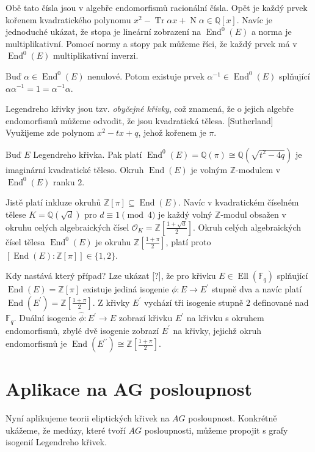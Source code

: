 \documentclass[12pt]{report}
\DeclareMathOperator{\Tr}{Tr}
\DeclareMathOperator{\N}{N}
\DeclareMathOperator{\End}{End}
\DeclareMathOperator{\Ell}{Ell}
\begin{document}
Obě tato čísla jsou v algebře endomorfismů racionální čísla. Opět je každý prvek kořenem kvadratického polynomu $x^2 - \Tr \alpha x + \N \alpha \in \mathbb{Q}[x]$. Navíc je jednoduché ukázat, že stopa je lineární zobrazení na $\End^0 (E)$ a norma je multiplikativní. Pomocí normy a stopy pak můžeme říci, že každý prvek má v $\End^0 (E)$ multiplikativní inverzi. 
\begin{veta}
Buď $\alpha \in \End^0 (E)$ nenulové. Potom existuje prvek $\alpha^{-1} \in \End^0 (E)$ splňující $\alpha \alpha^{-1} = 1 = \alpha^{-1} \alpha$. 
\end{veta}
Legendreho křivky jsou tzv. \textit{obyčejné křivky}, což znamená, že o jejich algebře endomorfismů můžeme odvodit, že jsou kvadratická tělesa. [Sutherland] Využijeme zde polynom $x^2-tx+q$, jehož kořenem je $\pi$.
\begin{dusledek}
Buď $E$ Legendreho křivka. Pak platí $\End^0(E) = \mathbb{Q}(\pi) \cong \mathbb{Q}(\sqrt{t^2-4q})$ je imaginární kvadratické těleso. Okruh $\End (E)$ je volným $\mathbb{Z}$-modulem v $\End^0 (E)$ ranku $2$.
\end{dusledek}
Jistě platí inkluze okruhů $\mathbb{Z}[\pi] \subseteq \End(E)$. Navíc v kvadratickém číselném tělese $K = \mathbb{Q}(\sqrt{d})$ pro $d \equiv 1 \pmod{4}$ je každý volný $\mathbb{Z}$-modul obsažen v okruhu celých algebraických čísel $\mathcal{O}_K = \mathbb{Z}\left[\frac{1+\sqrt{d}}{2}\right]$. Okruh celých algebraických čísel tělesa $\End^0 (E)$ je okruhu $\mathbb{Z}\left[\frac{1+\pi}{2}\right]$, platí proto $[\End(E):\mathbb{Z}[\pi]] \in \lbrace 1,2 \rbrace$.
 
Kdy nastává který případ? Lze ukázat [?], že pro křivku $E \in \Ell(\mathbb{F}_q)$ splňující $\End(E) = \mathbb{Z}[\pi]$ existuje jediná isogenie $\phi : E \longrightarrow E^{\prime}$ stupně dva a navíc platí $\End(E^{\prime}) = \mathbb{Z}\left[\frac{1+\pi}{2}\right]$. Z křivky $E^{\prime}$ vychází tři isogenie stupně $2$ definované nad $\mathbb{F}_q$. Duální isogenie $\widehat{\phi} : E^{\prime} \longrightarrow E$ zobrazí křivku $E^{\prime}$ na křivku s  okruhem endomorfismů, zbylé dvě isogenie zobrazí $E^{\prime}$ na křivky, jejichž okruh endomorfismů je $\End(E^{\prime \prime}) \cong  \mathbb{Z}\left[\frac{1+\pi}{2}\right]$. 


\section{Aplikace na AG posloupnost}

Nyní aplikujeme teorii eliptických křivek na $AG$ posloupnost. Konkrétně ukážeme, že medúzy, které tvoří $AG$ posloupnosti, můžeme propojit s grafy isogenií Legendreho křivek.
\end{document}
